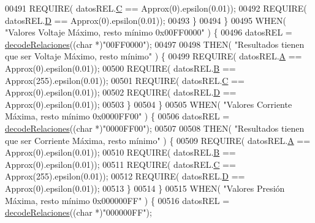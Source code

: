\begin{DoxyCode}
{00491                 REQUIRE( datosREL.\hyperlink{structRelacionesResponse_a37feda02f128b77f4f2d61cabcddc9e7}{C} == Approx(0).epsilon(0.01));
00492                 REQUIRE( datosREL.\hyperlink{structRelacionesResponse_ab76f55b12df3754a9bb5b102a1c06cbc}{D} == Approx(0).epsilon(0.01));
00493             \}
00494         \}
00495         WHEN( \textcolor{stringliteral}{"Valores Voltaje Máximo, resto mínimo 0x00FF0000"} ) \{
00496             datosREL = \hyperlink{decoders_8cpp_a88d7079325bf81705583d9f2101cfa15}{decodeRelaciones}((\textcolor{keywordtype}{char} *)\textcolor{stringliteral}{"00FF0000"});
00497 
00498             THEN( \textcolor{stringliteral}{"Resultados tienen que ser Voltaje Máximo, resto mínimo"} ) \{
00499                 REQUIRE( datosREL.\hyperlink{structRelacionesResponse_a560d1e6af01b999625b467ef3f858181}{A} == Approx(0).epsilon(0.01));
00500                 REQUIRE( datosREL.\hyperlink{structRelacionesResponse_a1216f6019af393dd85853f352533ed9d}{B} == Approx(255).epsilon(0.01));
00501                 REQUIRE( datosREL.\hyperlink{structRelacionesResponse_a37feda02f128b77f4f2d61cabcddc9e7}{C} == Approx(0).epsilon(0.01));
00502                 REQUIRE( datosREL.\hyperlink{structRelacionesResponse_ab76f55b12df3754a9bb5b102a1c06cbc}{D} == Approx(0).epsilon(0.01));
00503             \}
00504         \}
00505         WHEN( \textcolor{stringliteral}{"Valores Corriente Máxima, resto mínimo 0x0000FF00"} ) \{
00506             datosREL = \hyperlink{decoders_8cpp_a88d7079325bf81705583d9f2101cfa15}{decodeRelaciones}((\textcolor{keywordtype}{char} *)\textcolor{stringliteral}{"0000FF00"});
00507 
00508             THEN( \textcolor{stringliteral}{"Resultados tienen que ser Corriente Máxima, resto mínimo"} ) \{
00509                 REQUIRE( datosREL.\hyperlink{structRelacionesResponse_a560d1e6af01b999625b467ef3f858181}{A} == Approx(0).epsilon(0.01));
00510                 REQUIRE( datosREL.\hyperlink{structRelacionesResponse_a1216f6019af393dd85853f352533ed9d}{B} == Approx(0).epsilon(0.01));
00511                 REQUIRE( datosREL.\hyperlink{structRelacionesResponse_a37feda02f128b77f4f2d61cabcddc9e7}{C} == Approx(255).epsilon(0.01));
00512                 REQUIRE( datosREL.\hyperlink{structRelacionesResponse_ab76f55b12df3754a9bb5b102a1c06cbc}{D} == Approx(0).epsilon(0.01));
00513             \}
00514         \}
00515         WHEN( \textcolor{stringliteral}{"Valores Presión Máxima, resto mínimo 0x000000FF"} ) \{
00516             datosREL = \hyperlink{decoders_8cpp_a88d7079325bf81705583d9f2101cfa15}{decodeRelaciones}((\textcolor{keywordtype}{char} *)\textcolor{stringliteral}{"000000FF"});
}
\end{DoxyCode}
